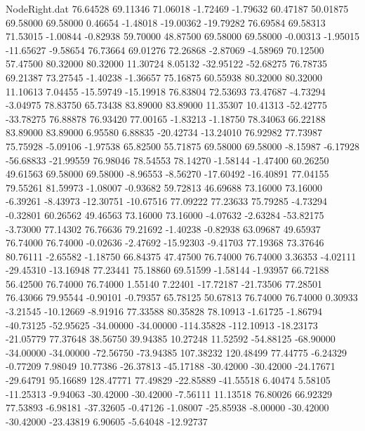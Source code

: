 \begin{filecontents}{NodeRight.dat}
  76.64528   69.11346   71.06018    -1.72469   -1.79632   60.47187   50.01875   69.58000   69.58000    0.46654   -1.48018  -19.00362  -19.79282
  76.69584   69.58313   71.53015    -1.00844   -0.82938   59.70000   48.87500   69.58000   69.58000   -0.00313   -1.95015  -11.65627   -9.58654
  76.73664   69.01276   72.26868    -2.87069   -4.58969   70.12500   57.47500   80.32000   80.32000   11.30724    8.05132  -32.95122  -52.68275
  76.78735   69.21387   73.27545    -1.40238   -1.36657   75.16875   60.55938   80.32000   80.32000   11.10613    7.04455  -15.59749  -15.19918
  76.83804   72.53693   73.47687    -4.73294   -3.04975   78.83750   65.73438   83.89000   83.89000   11.35307   10.41313  -52.42775  -33.78275
  76.88878   76.93420   77.00165    -1.83213   -1.18750   78.34063   66.22188   83.89000   83.89000    6.95580    6.88835  -20.42734  -13.24010
  76.92982   77.73987   75.75928    -5.09106   -1.97538   65.82500   55.71875   69.58000   69.58000   -8.15987   -6.17928  -56.68833  -21.99559
  76.98046   78.54553   78.14270    -1.58144   -1.47400   60.26250   49.61563   69.58000   69.58000   -8.96553   -8.56270  -17.60492  -16.40891
  77.04155   79.55261   81.59973    -1.08007   -0.93682   59.72813   46.69688   73.16000   73.16000   -6.39261   -8.43973  -12.30751  -10.67516
  77.09222   77.23633   75.79285    -4.73294   -0.32801   60.26562   49.46563   73.16000   73.16000   -4.07632   -2.63284  -53.82175   -3.73000
  77.14302   76.76636   79.21692    -1.40238   -0.82938   63.09687   49.65937   76.74000   76.74000   -0.02636   -2.47692  -15.92303   -9.41703
  77.19368   73.37646   80.76111    -2.65582   -1.18750   66.84375   47.47500   76.74000   76.74000    3.36353   -4.02111  -29.45310  -13.16948
  77.23441   75.18860   69.51599    -1.58144   -1.93957   66.72188   56.42500   76.74000   76.74000    1.55140    7.22401  -17.72187  -21.73506
  77.28501   76.43066   79.95544    -0.90101   -0.79357   65.78125   50.67813   76.74000   76.74000    0.30933   -3.21545  -10.12669   -8.91916
  77.33588   80.35828   78.10913    -1.61725   -1.86794  -40.73125  -52.95625  -34.00000  -34.00000 -114.35828 -112.10913  -18.23173  -21.05779
  77.37648   38.56750   39.94385    10.27248   11.52592  -54.88125  -68.90000  -34.00000  -34.00000  -72.56750  -73.94385  107.38232  120.48499
  77.44775   -6.24329   -0.77209     7.98049   10.77386  -26.37813  -45.17188  -30.42000  -30.42000  -24.17671  -29.64791   95.16689  128.47771
  77.49829  -22.85889  -41.55518     6.40474    5.58105  -11.25313   -9.94063  -30.42000  -30.42000   -7.56111   11.13518   76.80026   66.92329
  77.53893   -6.98181  -37.32605    -0.47126   -1.08007  -25.85938   -8.00000  -30.42000  -30.42000  -23.43819    6.90605   -5.64048  -12.92737

\end{filecontents}
